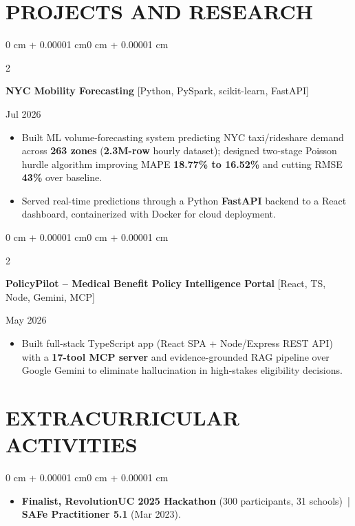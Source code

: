 \documentclass[10pt, letterpaper]{article}
\newenvironment{highlights}{
    \begin{itemize}[
        topsep=0.10 cm,
        parsep=0.06 cm,
        partopsep=0pt,
        itemsep=0.06 cm,
        leftmargin=12pt
    ]
}{
    \end{itemize}
}
\newenvironment{onecolentry}{
    \begin{adjustwidth}{0 cm + 0.00001 cm}{0 cm + 0.00001 cm}
}{
    \end{adjustwidth}
}
\newenvironment{twocolentry}[2][]{
    \onecolentry
    \def\secondColumn{#2}
    \setcolumnwidth{\fill, 4.5 cm}
    \begin{paracol}{2}
}{
    \switchcolumn \raggedleft \secondColumn
    \end{paracol}
    \endonecolentry
}
\begin{document}
\section{PROJECTS AND RESEARCH}
\begin{twocolentry}{Jul 2026}
\textbf{NYC Mobility Forecasting} [Python, PySpark, scikit-learn, FastAPI]
\end{twocolentry}
\begin{highlights}
  \item Built ML volume-forecasting system predicting NYC taxi/rideshare demand across \textbf{263 zones} (\textbf{2.3M-row} hourly dataset); designed two-stage Poisson hurdle algorithm improving MAPE \textbf{18.77\% to 16.52\%} and cutting RMSE \textbf{43\%} over baseline.
  \item Served real-time predictions through a Python \textbf{FastAPI} backend to a React dashboard, containerized with Docker for cloud deployment.
\end{highlights}

\vspace{0.12 cm}

\begin{twocolentry}{May 2026}
\textbf{PolicyPilot -- Medical Benefit Policy Intelligence Portal} [React, TS, Node, Gemini, MCP]
\end{twocolentry}
\begin{highlights}
  \item Built full-stack TypeScript app (React SPA + Node/Express REST API) with a \textbf{17-tool MCP server} and evidence-grounded RAG pipeline over Google Gemini to eliminate hallucination in high-stakes eligibility decisions.
\end{highlights}

\section{EXTRACURRICULAR ACTIVITIES}
\begin{onecolentry}
\begin{highlights}
  \item \textbf{Finalist, RevolutionUC 2025 Hackathon} (300 participants, 31 schools) \,|\, \textbf{SAFe Practitioner 5.1} (Mar 2023).
\end{highlights}
\end{onecolentry}
\end{document}

